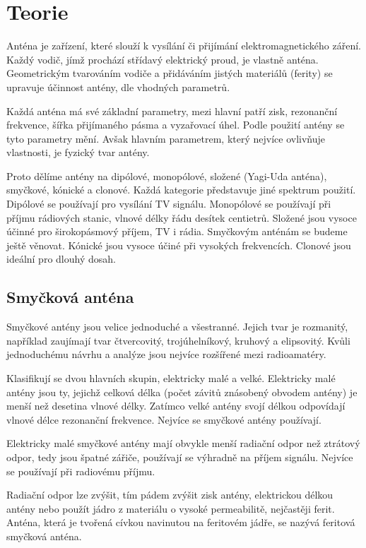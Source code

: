 \section{Teorie}

Anténa je zařízení, které slouží k vysílání či přijímání elektromagnetického záření.
Každý vodič, jímž prochází střídavý elektrický proud, je vlastně anténa. Geometrickým
tvarováním vodiče a přidáváním jistých materiálů (ferity) se upravuje účinnost antény, dle
vhodných parametrů.

Každá anténa má své základní parametry, mezi hlavní patří zisk, rezonanční frekvence,
šířka přijímaného pásma a vyzařovací úhel. Podle použití antény se tyto parametry mění.
Avšak hlavním parametrem, který nejvíce ovlivňuje vlastnosti, je fyzický tvar antény.

Proto dělíme antény na dipólové, monopólové, složené (Yagi-Uda anténa), smyčkové, kónické
a clonové. Každá kategorie představuje jiné spektrum použití. Dipólové
se používají pro vysílání TV signálu. Monopólové se používají při
příjmu rádiových stanic, vlnové délky řádu desítek centietrů. Složené jsou vysoce účinné
pro širokopásmový příjem, TV i rádia. Smyčkovým anténám se budeme ještě věnovat. Kónické
jsou vysoce účiné při vysokých frekvencích. Clonové jsou ideální pro dlouhý dosah.

\subsection{Smyčková anténa}

Smyčkové antény jsou velice jednoduché a všestranné. Jejich tvar je rozmanitý, například
zaujímají tvar čtvercovitý, trojúhelníkový, kruhový a elipsovitý. Kvůli jednoduchému
návrhu a analýze jsou nejvíce rozšířené mezi radioamatéry.

Klasifikují se dvou hlavních skupin, elektricky malé a velké. Elektricky malé antény jsou
ty, jejichž celková délka (počet závitů znásobený obvodem antény) je menší než desetina
vlnové délky. Zatímco velké antény svojí délkou odpovídají vlnové délce rezonanční
frekvence. Nejvíce se smyčkové antény používají.

Elektricky malé smyčkové antény mají obvykle menší radiační odpor než ztrátový odpor, tedy
jsou špatné zářiče, používají se výhradně na příjem signálu. Nejvíce se používají při
radiovému příjmu.

Radiační odpor lze zvýšit, tím pádem zvýšit zisk antény, elektrickou délkou antény nebo
použít jádro z materiálu o vysoké permeabilitě, nejčastěji ferit. Anténa, která je tvořená
cívkou navinutou na feritovém jádře, se nazývá feritová smyčková anténa.

